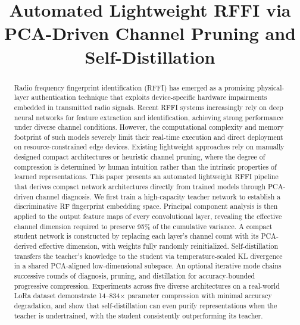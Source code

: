 \documentclass[10pt, conference]{IEEEtran}
\begin{document}
\title{Automated Lightweight RFFI via PCA-Driven Channel Pruning and Self-Distillation}

\author{


}

\maketitle


\begin{abstract}
Radio frequency fingerprint identification (RFFI) has emerged as a promising physical-layer authentication technique that exploits device-specific hardware impairments embedded in transmitted radio signals.
Recent RFFI systems increasingly rely on deep neural networks for feature extraction and identification, achieving strong performance under diverse channel conditions.
However, the computational complexity and memory footprint of such models severely limit their real-time execution and direct deployment on resource-constrained edge devices.
Existing lightweight approaches rely on manually designed compact architectures or heuristic channel pruning, where the degree of compression is determined by human intuition rather than the intrinsic properties of learned representations.
This paper presents an automated lightweight RFFI pipeline that derives compact network architectures directly from trained models through PCA-driven channel diagnosis.
We first train a high-capacity teacher network to establish a discriminative RF fingerprint embedding space.
Principal component analysis is then applied to the output feature maps of every convolutional layer, revealing the effective channel dimension required to preserve 95\% of the cumulative variance.
A compact student network is constructed by replacing each layer's channel count with its PCA-derived effective dimension, with weights fully randomly reinitialized.
Self-distillation transfers the teacher's knowledge to the student via temperature-scaled KL divergence in a shared PCA-aligned low-dimensional subspace.
An optional iterative mode chains successive rounds of diagnosis, pruning, and distillation for accuracy-bounded progressive compression.
Experiments across five diverse architectures on a real-world LoRa dataset demonstrate 14--834$\times$ parameter compression with minimal accuracy degradation, and show that self-distillation can even purify representations when the teacher is undertrained, with the student consistently outperforming its teacher.
\end{abstract}
\end{document}
